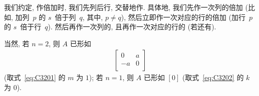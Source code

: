 \documentclass[../libro.tex]{subfiles}
\begin{document}
\begin{theorem}
    我们约定, 作倍加时, 我们先列后行, 交替地作.
    具体地, 我们先作一次列的倍加
    (比如, 加列~\(p\) 的 \(s\)~倍于列~\(q\),
    其中, \(p \neq q\)),
    然后立即作一次对应的行的倍加
    (加行~\(p\) 的 \(s\)~倍于行~\(q\)).
    然后再作一次列的, 且再作一次对应的行的 (若还有).

    当然, 若 \(n = 2\), 则 \(A\) 已形如
    \begin{align*}
        \begin{bmatrix}
            0  & a \\
            -a & 0 \\
        \end{bmatrix}
    \end{align*}
    (取式~\eqref{eq:C3201} 的 \(m\) 为 \(1\));
    若 \(n = 1\), 则 \(A\) 已形如
    \([0]\)
    (取式~\eqref{eq:C3202} 的 \(k\) 为 \(0\)).
\end{theorem}
\end{document}

